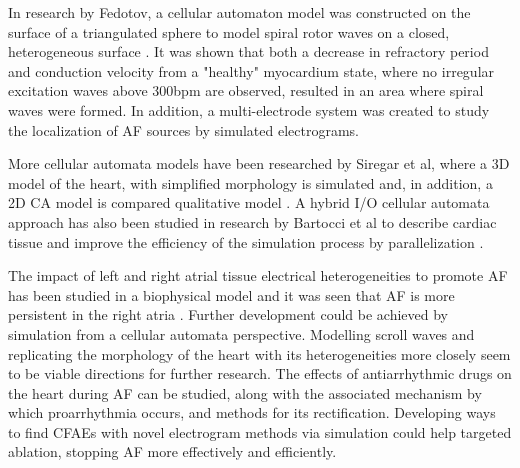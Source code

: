 \documentclass[twocolumn]{article}
\begin{document}
In research by Fedotov, a cellular automaton model was constructed on the surface of a triangulated sphere to model spiral rotor waves on a closed, heterogeneous surface \cite{Fedotov}. It was shown that both a decrease in refractory period and conduction velocity from a "healthy" myocardium state, where no irregular excitation waves above 300bpm are observed, resulted in an area where spiral waves were formed. In addition, a multi-electrode system was created to study the localization of AF sources by simulated electrograms. 


More cellular automata models have been researched by Siregar et al, where a 3D model of the heart, with simplified morphology is simulated and, in addition, a 2D CA model is compared qualitative model \cite{Siregar} \cite{Siregar2}. A hybrid I/O cellular automata approach has also been studied in research by Bartocci et al to describe cardiac tissue and improve the efficiency of the simulation process by parallelization \cite{Bartocci}.

 The impact of left and right atrial tissue electrical heterogeneities to promote AF has been studied in a biophysical model and it was seen that AF is more persistent in the right atria \cite{Luca}. Further development could be achieved by simulation from a cellular automata perspective. Modelling scroll waves and replicating the morphology of the heart with its heterogeneities more closely seem to be viable directions for further research. The effects of antiarrhythmic drugs on the heart during AF can be studied, along with the associated mechanism by which proarrhythmia occurs, and methods for its rectification. Developing ways to find CFAEs with novel electrogram methods via simulation could help targeted ablation, stopping AF more effectively and efficiently. 






\end{document}
